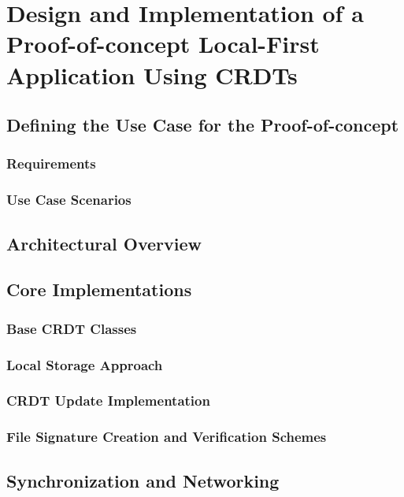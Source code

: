\chapter{Design and Implementation of a Proof-of-concept Local-First Application Using CRDTs}

\section{Defining the Use Case for the Proof-of-concept}

\subsection{Requirements}

\subsection{Use Case Scenarios}

\section{Architectural Overview}

\section{Core Implementations}

\subsection{Base CRDT Classes}

\subsection{Local Storage Approach}

\subsection{CRDT Update Implementation}

\subsection{File Signature Creation and Verification Schemes}

\section{Synchronization and Networking}

